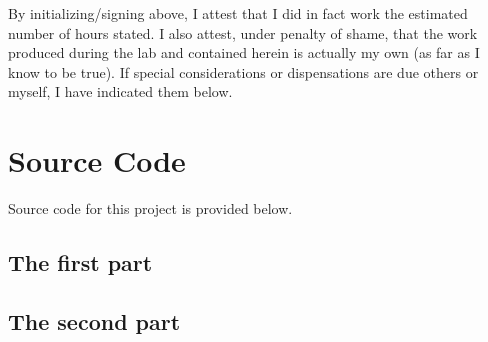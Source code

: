 \documentclass[12pt]{article} %
\begin{document}
By initializing/signing above, I attest that I did in fact work the estimated number of hours stated. I also attest, under penalty of shame, that the work produced during the lab and contained herein is actually my own (as far as I know to be true). If special considerations or dispensations are due others or myself, I have indicated them below.

\pagebreak

\section{Source Code}

Source code for this project is provided below.

\subsection{The first part}
% 

\subsection{The second part}
% 
\end{document}
